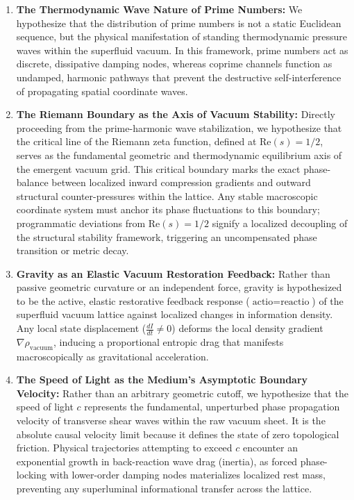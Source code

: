 \documentclass[twocolumn]{aa}
\begin{document}
\begin{enumerate}
    \setlength{\itemsep}{12pt} %
    \setlength{\parsep}{4pt}   %
    
    \item \textbf{The Thermodynamic Wave Nature of Prime Numbers:} 
    We hypothesize that the distribution of prime numbers is not a static Euclidean sequence, but the physical manifestation of standing thermodynamic pressure waves within the superfluid vacuum. In this framework, prime numbers act as discrete, dissipative damping nodes, whereas coprime channels function as undamped, harmonic pathways that prevent the destructive self-interference of propagating spatial coordinate waves.
    
    \item \textbf{The Riemann Boundary as the Axis of Vacuum Stability:} 
    Directly proceeding from the prime-harmonic wave stabilization, we hypothesize that the critical line of the Riemann zeta function, defined at $\text{Re}(s) = 1/2$, serves as the fundamental geometric and thermodynamic equilibrium axis of the emergent vacuum grid. This critical boundary marks the exact phase-balance between localized inward compression gradients and outward structural counter-pressures within the lattice. Any stable macroscopic coordinate system must anchor its phase fluctuations to this boundary; programmatic deviations from $\text{Re}(s) = 1/2$ signify a localized decoupling of the structural stability framework, triggering an uncompensated phase transition or metric decay.

    \item \textbf{Gravity as an Elastic Vacuum Restoration Feedback:} 
    Rather than passive geometric curvature or an independent force, gravity is hypothesized to be the active, elastic restorative feedback response ($\text{actio} = \text{reactio}$) of the superfluid vacuum lattice against localized changes in information density. Any local state displacement ($\frac{dI}{dt} \neq 0$) deforms the local density gradient $\nabla\rho_{\text{vacuum}}$, inducing a proportional entropic drag that manifests macroscopically as gravitational acceleration.
    
    \item \textbf{The Speed of Light as the Medium's Asymptotic Boundary Velocity:} 
    Rather than an arbitrary geometric cutoff, we hypothesize that the speed of light $c$ represents the fundamental, unperturbed phase propagation velocity of transverse shear waves within the raw vacuum sheet. It is the absolute causal velocity limit because it defines the state of zero topological friction. Physical trajectories attempting to exceed $c$ encounter an exponential growth in back-reaction wave drag (inertia), as forced phase-locking with lower-order damping nodes materializes localized rest mass, preventing any superluminal informational transfer across the lattice.
 

\end{enumerate}
\end{document}
